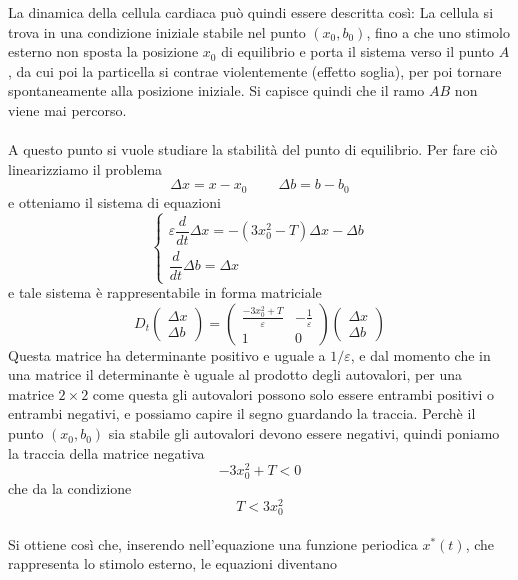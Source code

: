 \documentclass[12pt]{article}
\begin{document}
La dinamica della cellula cardiaca può quindi essere descritta così: La cellula si trova in una condizione iniziale stabile nel punto $(x_0,b_0)$, fino a che uno stimolo esterno non sposta la posizione $x_0$ di equilibrio e porta il sistema verso il punto $A$, da cui poi la particella si contrae violentemente (effetto soglia), per poi tornare spontaneamente alla posizione iniziale. Si capisce quindi che il ramo $AB$ non viene mai percorso. \\ \\
A questo punto si vuole studiare la stabilità del punto di equilibrio. Per fare ciò linearizziamo il problema
$$
	\Delta x = x - x_0 \ \ \ \ \ \ \ \ \ \ \Delta b = b - b_0
$$
e otteniamo il sistema di equazioni
\begin{equation}
	\begin{cases}
		\varepsilon\dfrac{d}{dt}\Delta x = -(3x_0^2 - T)\Delta x - \Delta b \\
		\dfrac{d}{dt} \Delta b = \Delta x
	\end{cases}
\end{equation}
e tale sistema è rappresentabile in forma matriciale
\begin{equation}
	D_t \begin{pmatrix}
		\Delta x \\
		\Delta b
	\end{pmatrix} = \begin{pmatrix}
	\frac{-3x_0^2 + T}{\varepsilon} & -\frac{1}{\varepsilon} \\
	1 & 0
\end{pmatrix} \begin{pmatrix}
	\Delta x \\
	\Delta b
\end{pmatrix}
\end{equation}
Questa matrice ha determinante positivo e uguale a $1/\varepsilon$, e dal momento che in una matrice il determinante è uguale al prodotto degli autovalori, per una matrice $2\times 2$ come questa gli autovalori possono solo essere entrambi positivi o entrambi negativi, e possiamo capire il segno guardando la traccia. Perchè il punto $(x_0,b_0)$ sia stabile gli autovalori devono essere negativi, quindi poniamo la traccia della matrice negativa
$$
	-3x_0^2 + T < 0
$$ 
che da la condizione 
\begin{equation}
	T < 3x_0^2
\end{equation} \\
Si ottiene così che, inserendo nell'equazione una funzione periodica $x^*(t)$, che rappresenta lo stimolo esterno, le equazioni diventano
\end{document}
